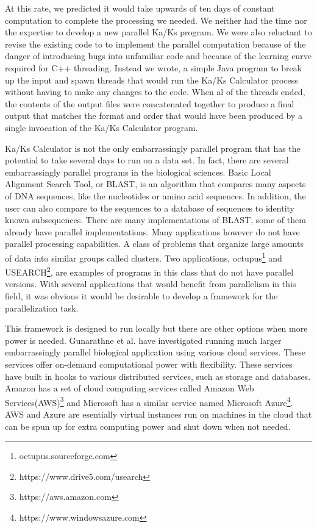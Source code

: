 \documentclass[12pt]{article}
\begin{document}
At this rate, we predicted it would take upwards of ten days of constant
computation to complete the processing we needed. We neither had the time nor
the expertise to develop a new parallel Ka/Ks program. We were also reluctant to
revise the existing code to to implement the parallel computation because of the
danger of introducing bugs into unfamiliar code and because of the learning
curve required for C++ threading. Instead we wrote, a simple Java program to
break up the input and spawn threads that would run the Ka/Ks Calculator process
without having to make any changes to the code. When al of the threads ended,
the contents of the output files were concatenated together to produce a final
output that matches the format and order that would have been produced by a
single invocation of the Ka/Ks Calculator program.

Ka/Ks Calculator is not the only embarrassingly parallel program that has the
potential to take several days to run on a data set. In fact, there are several
embarrassingly parallel programs in the biological sciences. Basic Local
Alignment Search Tool, or BLAST, is an
algorithm that compares many aspects of DNA sequences, like the nucleotides or
amino acid sequences. In addition, the user can also compare to the sequences to
a database of sequences to identity known subsequences. There are many
implementations of BLAST, some of them already have parallel implementations.
Many applications however do not have parallel processing capabilities. A class
of problems that organize large amounts of data into similar groups called
clusters. Two applications, octupus\footnote{octupus.sourceforge.com} and
USEARCH\footnote{https://www.drive5.com/usearch}, are examples of programs in
this class that do not have parallel versions. With several applications that
would benefit from parallelism in this field, it was obvious it would be
desirable to develop a framework for the parallelization task.

This framework is designed to run locally but there are other options when more
power is needed. Gunarathne et al.\cite{cloud} have investigated running much
larger embarrassingly parallel biological application using various cloud
services. These services offer on-demand computational power with flexibility.
These services have built in hooks to various distributed services, such as
storage and databases. Amazon has a set of cloud computing services called
Amazon Web Services(AWS)\footnote{https://aws.amazon.com} and Microsoft has a
similar service named Microsoft Azure\footnote{https://www.windowsazure.com}.
AWS and Azure are esentially virtual instances run on machines in the cloud that
can be spun up for extra computing power and shut down when not needed. 
\end{document}
